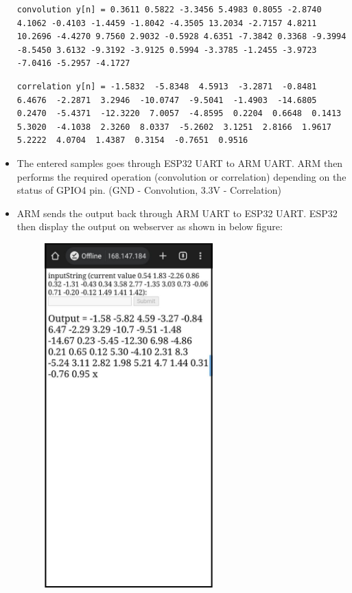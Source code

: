 \documentclass[journal,12pt,twocolumn]{IEEEtran}
\begin{document}
\begin{itemize}
\begin{lstlisting}
    \end{lstlisting}
    \begin{lstlisting}
convolution y[n] = 0.3611 0.5822 -3.3456 5.4983 0.8055 -2.8740 4.1062 -0.4103 -1.4459 -1.8042 -4.3505 13.2034 -2.7157 4.8211 10.2696 -4.4270 9.7560 2.9032 -0.5928 4.6351 -7.3842 0.3368 -9.3994 -8.5450 3.6132 -9.3192 -3.9125 0.5994 -3.3785 -1.2455 -3.9723 -7.0416 -5.2957 -4.1727  
    \end{lstlisting}
    \begin{lstlisting}
correlation y[n] = -1.5832  -5.8348  4.5913  -3.2871  -0.8481  6.4676  -2.2871  3.2946  -10.0747  -9.5041  -1.4903  -14.6805  0.2470  -5.4371  -12.3220  7.0057  -4.8595  0.2204  0.6648  0.1413  5.3020  -4.1038  2.3260  8.0337  -5.2602  3.1251  2.8166  1.9617  5.2222  4.0704  1.4387  0.3154  -0.7651  0.9516
    \end{lstlisting}
    \item The entered samples goes through ESP32 UART to ARM UART. ARM then performs the required operation (convolution or correlation) depending on the status of GPIO4 pin. 
    (GND - Convolution, 3.3V - Correlation)
    \item ARM sends the output back through ARM UART to ESP32 UART. ESP32 then display the output on webserver as shown in below figure:
    \begin{figure}[ht]
    \centering
    \includegraphics[width = 6.5cm]{Figures/Fig2.jpg}
    \end{figure}
\end{itemize}
\end{document}
